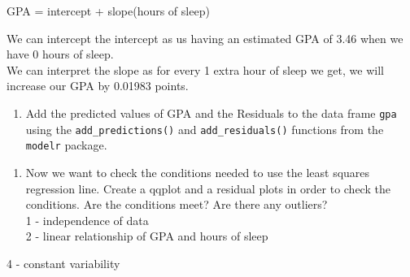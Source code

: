 \documentclass[]{article}
\newenvironment{Shaded}{\begin{snugshade}}{\end{snugshade}}
\newcommand{\DataTypeTok}[1]{\textcolor[rgb]{0.13,0.29,0.53}{#1}}
\newcommand{\KeywordTok}[1]{\textcolor[rgb]{0.13,0.29,0.53}{\textbf{#1}}}
\newcommand{\NormalTok}[1]{#1}
\newcommand{\OperatorTok}[1]{\textcolor[rgb]{0.81,0.36,0.00}{\textbf{#1}}}
\newcommand{\StringTok}[1]{\textcolor[rgb]{0.31,0.60,0.02}{#1}}
\providecommand{\tightlist}{%
  \setlength{\itemsep}{0pt}\setlength{\parskip}{0pt}}
\begin{document}
GPA = intercept + slope(hours of sleep)

We can intercept the intercept as us having an estimated GPA of 3.46
when we have 0 hours of sleep.\\
We can interpret the slope as for every 1 extra hour of sleep we get, we
will increase our GPA by 0.01983 points.

\newpage

\begin{enumerate}
\def\labelenumi{\arabic{enumi}.}
\setcounter{enumi}{5}
\tightlist
\item
  Add the predicted values of GPA and the Residuals to the data frame
  \texttt{gpa} using the \texttt{add\_predictions()} and
  \texttt{add\_residuals()} functions from the \texttt{modelr} package.
\end{enumerate}

\begin{Shaded}
\end{Shaded}

\begin{Shaded}
\end{Shaded}

\begin{enumerate}
\def\labelenumi{\arabic{enumi}.}
\setcounter{enumi}{6}
\tightlist
\item
  Now we want to check the conditions needed to use the least squares
  regression line. Create a qqplot and a residual plots in order to
  check the conditions. Are the conditions meet? Are there any
  outliers?\\
  1 - independence of data\\
  2 - linear relationship of GPA and hours of sleep
\end{enumerate}

4 - constant variability

\begin{Shaded}
\end{Shaded}
\end{document}
